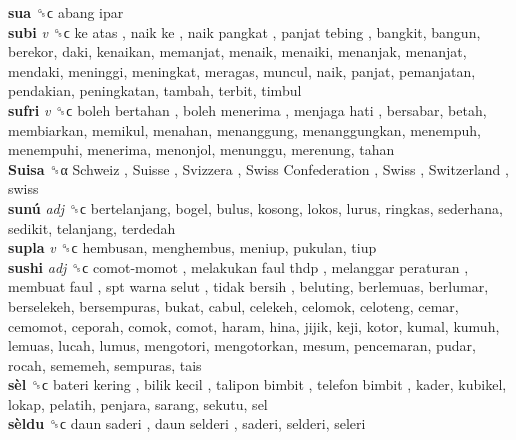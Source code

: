 \textbf{sua} ␝ϲ   abang ipar   \\
\textbf{subi} \emph{v}  ␝ϲ   ke atas ,  naik ke ,  naik pangkat ,  panjat tebing , bangkit, bangun, berekor, daki, kenaikan, memanjat, menaik, menaiki, menanjak, menanjat, mendaki, meninggi, meningkat, meragas, muncul, naik, panjat, pemanjatan, pendakian, peningkatan, tambah, terbit, timbul  \\
\textbf{sufri} \emph{v}  ␝ϲ   boleh bertahan ,  boleh menerima ,  menjaga hati , bersabar, betah, membiarkan, memikul, menahan, menanggung, menanggungkan, menempuh, menempuhi, menerima, menonjol, menunggu, merenung, tahan  \\
\textbf{Suisa} ␝α   Schweiz ,  Suisse ,  Svizzera ,  Swiss Confederation ,  Swiss ,  Switzerland , swiss  \\
\textbf{sunú} \emph{adj}  ␝ϲ  bertelanjang, bogel, bulus, kosong, lokos, lurus, ringkas, sederhana, sedikit, telanjang, terdedah  \\
\textbf{supla} \emph{v}  ␝ϲ  hembusan, menghembus, meniup, pukulan, tiup  \\
\textbf{sushi} \emph{adj}  ␝ϲ   comot-momot ,  melakukan faul thdp ,  melanggar peraturan ,  membuat faul ,  spt warna selut ,  tidak bersih , beluting, berlemuas, berlumar, berselekeh, bersempuras, bukat, cabul, celekeh, celomok, celoteng, cemar, cemomot, ceporah, comok, comot, haram, hina, jijik, keji, kotor, kumal, kumuh, lemuas, lucah, lumus, mengotori, mengotorkan, mesum, pencemaran, pudar, rocah, sememeh, sempuras, tais  \\
\textbf{sèl} ␝ϲ   bateri kering ,  bilik kecil ,  talipon bimbit ,  telefon bimbit , kader, kubikel, lokap, pelatih, penjara, sarang, sekutu, sel  \\
\textbf{sèldu} ␝ϲ   daun saderi ,  daun selderi , saderi, selderi, seleri  \\
